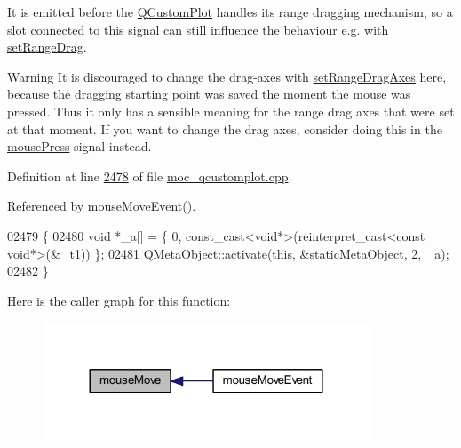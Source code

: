 It is emitted before the \hyperlink{a00030_d8/d00/a00186}{Q\+Custom\+Plot} handles its range dragging mechanism, so a slot connected to this signal can still influence the behaviour e.\+g. with \hyperlink{a00116_aa0e1c44295da2706d0f12ad48f64b806}{set\+Range\+Drag}.

\begin{DoxyWarning}{Warning}
It is discouraged to change the drag-\/axes with \hyperlink{a00116_a9fa10e826a174884391c1c839d52c0a3}{set\+Range\+Drag\+Axes} here, because the dragging starting point was saved the moment the mouse was pressed. Thus it only has a sensible meaning for the range drag axes that were set at that moment. If you want to change the drag axes, consider doing this in the \hyperlink{a00116_aca75bf9afb5dd19349c375de2a87a051}{mouse\+Press} signal instead. 
\end{DoxyWarning}


Definition at line \hyperlink{a00067_source_l02478}{2478} of file \hyperlink{a00067_source}{moc\+\_\+qcustomplot.\+cpp}.



Referenced by \hyperlink{a00115_source_l07639}{mouse\+Move\+Event()}.


\begin{DoxyCode}
02479 \{
02480     \textcolor{keywordtype}{void} *\_a[] = \{ 0, \textcolor{keyword}{const\_cast<}\textcolor{keywordtype}{void}*\textcolor{keyword}{>}(\textcolor{keyword}{reinterpret\_cast<}\textcolor{keyword}{const }\textcolor{keywordtype}{void}*\textcolor{keyword}{>}(&\_t1)) \};
02481     QMetaObject::activate(\textcolor{keyword}{this}, &staticMetaObject, 2, \_a);
02482 \}
\end{DoxyCode}


Here is the caller graph for this function\+:
\nopagebreak
\begin{figure}[H]
\begin{center}
\leavevmode
\includegraphics[width=276pt]{d4/d3e/a00116_a742ca4f94688bed2a685fd8a56ce5704_icgraph}
\end{center}
\end{figure}


